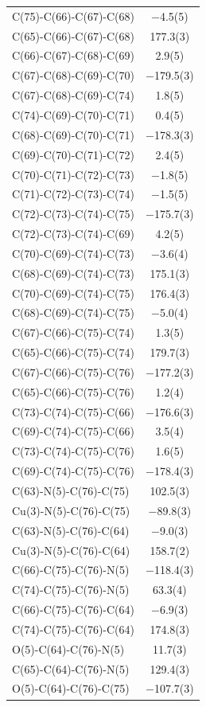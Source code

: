 \begin{center}
{\begin{supertabular}{p{1.8in}c}
C(75)-C(66)-C(67)-C(68)&$-$4.5(5)\\
C(65)-C(66)-C(67)-C(68)&177.3(3)\\
C(66)-C(67)-C(68)-C(69)&2.9(5)\\
C(67)-C(68)-C(69)-C(70)&$-$179.5(3)\\
C(67)-C(68)-C(69)-C(74)&1.8(5)\\
C(74)-C(69)-C(70)-C(71)&0.4(5)\\
C(68)-C(69)-C(70)-C(71)&$-$178.3(3)\\
C(69)-C(70)-C(71)-C(72)&2.4(5)\\
C(70)-C(71)-C(72)-C(73)&$-$1.8(5)\\
C(71)-C(72)-C(73)-C(74)&$-$1.5(5)\\
C(72)-C(73)-C(74)-C(75)&$-$175.7(3)\\
C(72)-C(73)-C(74)-C(69)&4.2(5)\\
C(70)-C(69)-C(74)-C(73)&$-$3.6(4)\\
C(68)-C(69)-C(74)-C(73)&175.1(3)\\
C(70)-C(69)-C(74)-C(75)&176.4(3)\\
C(68)-C(69)-C(74)-C(75)&$-$5.0(4)\\
C(67)-C(66)-C(75)-C(74)&1.3(5)\\
C(65)-C(66)-C(75)-C(74)&179.7(3)\\
C(67)-C(66)-C(75)-C(76)&$-$177.2(3)\\
C(65)-C(66)-C(75)-C(76)&1.2(4)\\
C(73)-C(74)-C(75)-C(66)&$-$176.6(3)\\
C(69)-C(74)-C(75)-C(66)&3.5(4)\\
C(73)-C(74)-C(75)-C(76)&1.6(5)\\
C(69)-C(74)-C(75)-C(76)&$-$178.4(3)\\
C(63)-N(5)-C(76)-C(75)&102.5(3)\\
Cu(3)-N(5)-C(76)-C(75)&$-$89.8(3)\\
C(63)-N(5)-C(76)-C(64)&$-$9.0(3)\\
Cu(3)-N(5)-C(76)-C(64)&158.7(2)\\
C(66)-C(75)-C(76)-N(5)&$-$118.4(3)\\
C(74)-C(75)-C(76)-N(5)&63.3(4)\\
C(66)-C(75)-C(76)-C(64)&$-$6.9(3)\\
C(74)-C(75)-C(76)-C(64)&174.8(3)\\
O(5)-C(64)-C(76)-N(5)&11.7(3)\\
C(65)-C(64)-C(76)-N(5)&129.4(3)\\
O(5)-C(64)-C(76)-C(75)&$-$107.7(3)\\

\end{supertabular}}
\end{center}
